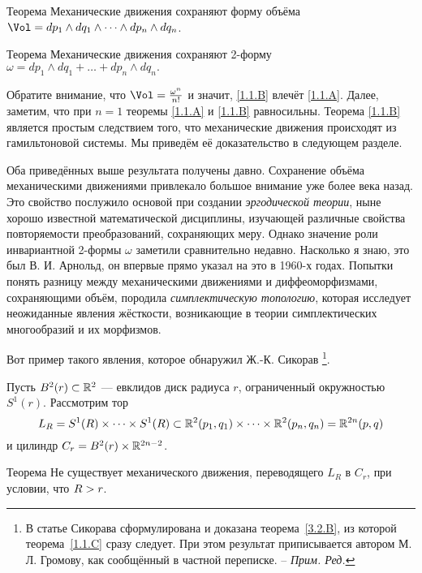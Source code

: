 \begin{thm}{Теорема}\label{1.1.A}
Механические движения сохраняют форму объёма 
$\Vol=dp_1\wedge dq_1\wedge\dots\wedge d p_n\wedge dq_n$.
\end{thm}

\begin{thm}{Теорема}\label{1.1.B}
Механические движения сохраняют 2-форму $\omega = dp_1 \wedge dq_1 +\dots
+ dp_n \wedge dq_n.$
\end{thm}

Обратите внимание, что $\Vol = \tfrac{\omega^n}{n!}$ и значит, \ref{1.1.B} влечёт \ref{1.1.A}.
Далее, заметим, что при $n = 1$ теоремы \ref{1.1.A} и \ref{1.1.B} равносильны.
Теорема \ref{1.1.B} является простым следствием того, что механические движения происходят из гамильтоновой системы.
Мы приведём её доказательство в следующем разделе.

Оба приведённых выше результата получены давно.
Сохранение объёма механическими движениями привлекало большое внимание уже более века назад.
Это свойство послужило основой при создании {}\emph{эргодической теории}, ныне хорошо известной математической дисциплины, изучающей различные свойства повторяемости преобразований, сохраняющих меру.
Однако значение роли инвариантной 2-формы $\omega$ заметили сравнительно недавно.
Насколько я знаю, это был В. И. Арнольд, он впервые прямо указал на это в 1960-х годах.
Попытки понять разницу между механическими движениями и диффеоморфизмами, сохраняющими объём, породила {}\emph{симплектическую топологию}, которая исследует неожиданные явления жёсткости, возникающие в теории симплектических многообразий и их морфизмов.

Вот пример такого явления, которое обнаружил
Ж.-К. Сикорав \cite{S1}%
\footnote{\label{foot:sikorav}В статье Сикорава сформулирована и доказана
  теорема~\ref{3.2.B}, из которой теорема~\ref{1.1.C} сразу
  следует. При этом результат приписывается автором М. Л. Громову, как
  сообщённый в частной переписке. -- \textit{Прим. Ред.}}.
  
Пусть $B^2(r) \subset \mathbb{R}^2$ — евклидов диск радиуса $r$, ограниченный окружностью $S^1(r)$.
Рассмотрим тор 
\[L_R = 
S^1 (R) \times\dots\times S^1(R) \subset \mathbb{R}^2 (p_1, q_1) \times\dots\times \mathbb{R}^2 (p_n, q_n) =\mathbb{R}^{2n} (p, q)\]
и цилиндр $C_r = B^2 (r) \times \mathbb{R}^{2n-2}$.


\begin{thm}{Теорема}\label{1.1.C}
Не существует механического движения, переводящего $L_R$ в $C_r$, при условии, что $R\z>r$.
\end{thm}

